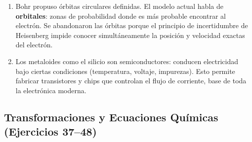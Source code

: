 \documentclass[12pt, letterpaper]{article}
\begin{document}
\begin{enumerate}[leftmargin=*, label=\textbf{\arabic*.}]
    \item Bohr propuso órbitas circulares definidas. El modelo actual habla de \textbf{orbitales}: zonas de probabilidad donde es más probable encontrar al electrón. Se abandonaron las órbitas porque el principio de incertidumbre de Heisenberg impide conocer simultáneamente la posición y velocidad exactas del electrón.

    \item Los metaloides como el silicio son semiconductores: conducen electricidad bajo ciertas condiciones (temperatura, voltaje, impurezas). Esto permite fabricar transistores y chips que controlan el flujo de corriente, base de toda la electrónica moderna.
  \end{enumerate}

  \subsection*{Transformaciones y Ecuaciones Químicas (Ejercicios 37--48)}
\end{document}
